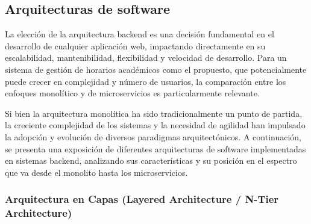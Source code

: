 \subsection{Arquitecturas de software}

La elección de la arquitectura backend es una decisión fundamental en el desarrollo de cualquier aplicación web, impactando directamente en su escalabilidad, mantenibilidad, flexibilidad y velocidad de desarrollo. Para un sistema de gestión de horarios académicos como el propuesto, que potencialmente puede crecer en complejidad y número de usuarios, la comparación entre los enfoques monolítico y de microservicios es particularmente relevante.

Si bien la arquitectura monolítica ha sido tradicionalmente un punto de partida, la creciente complejidad de los sistemas y la necesidad de agilidad han impulsado la adopción y evolución de diversos paradigmas arquitectónicos. A continuación, se presenta una exposición de diferentes arquitecturas de software \cite{bookORellySoftwareArchitecture} implementadas en sistemas backend, analizando sus características y su posición en el espectro que va desde el monolito hasta los microservicios.

\subsubsection*{Arquitectura en Capas (Layered Architecture / N-Tier Architecture)}

